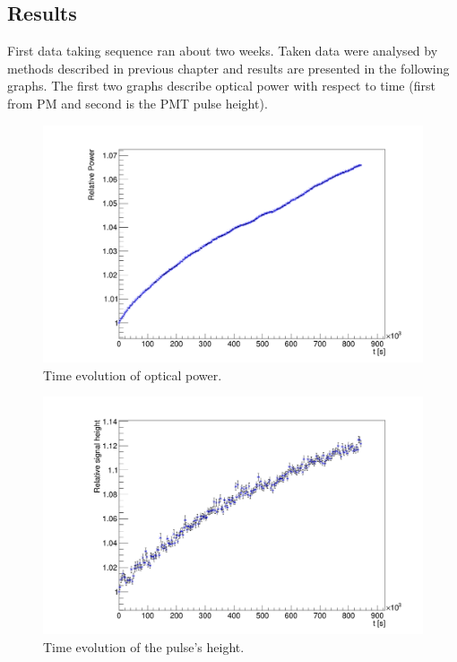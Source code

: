 \subsection{Results}
First data taking sequence ran about two weeks. Taken data were analysed by methods described in previous chapter and results are presented in the following graphs. The first two graphs describe 
optical power with respect to time (first from PM and second is the PMT pulse height).
\begin{figure}[H]
 \centering
 \includegraphics[scale=0.3]{./pictures/powers}
 \caption{Time evolution of optical power.}
 \label{pow1}
\end{figure}



\begin{figure}[H]
 \centering
 \includegraphics[scale=0.3]{./pictures/Height}
 \caption{Time evolution of the pulse's height.}
 \label{height1}
\end{figure}

